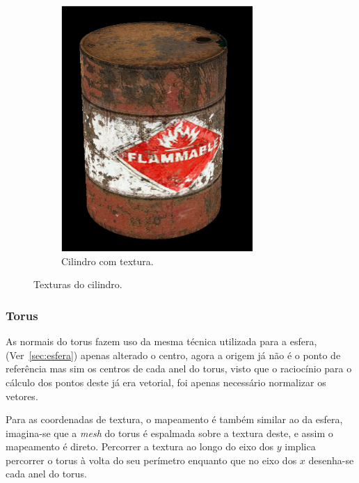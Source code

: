 \documentclass[a4paper]{article}
\begin{document}
\begin{figure}[H]
\begin{subfigure}{0.4\textwidth}
        \includegraphics[width=0.8\textwidth]{cylinder.png}
        \caption{Cilindro com textura.}
    \end{subfigure}
    \caption{Texturas do cilindro.}\label{fig:cilindro}
\end{figure}

\subsubsection{Torus}
As normais do torus fazem uso da mesma técnica utilizada para a esfera,
(Ver~\ref{sec:esfera}) apenas alterado o centro, agora a origem já não é o
ponto de referência mas sim os centros de cada anel do torus, visto que o
raciocínio para o cálculo dos pontos deste já era vetorial, foi apenas
necessário normalizar os vetores.

Para as coordenadas de textura, o mapeamento é também similar ao da esfera,
imagina-se que a \textit{mesh} do torus é espalmada sobre a textura deste, e
assim o mapeamento é direto. Percorrer a textura ao longo do eixo dos $y$
implica percorrer o torus à volta do seu perímetro enquanto que no eixo dos $x$
desenha-se cada anel do torus.
\end{document}
